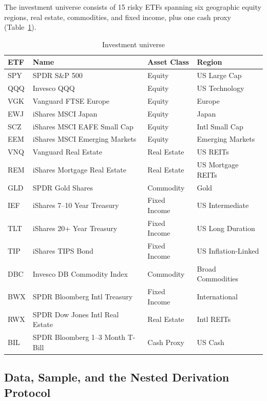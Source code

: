 The investment universe consists of 15 risky ETFs spanning six geographic equity
regions, real estate, commodities, and fixed income, plus one cash proxy
(Table~\ref{tab:universe}).

\begin{table}[H]
\centering
\caption{Investment universe}
\label{tab:universe}
\small
\begin{tabular}{llll}
\toprule
ETF & Name & Asset Class & Region \\
\midrule
SPY & SPDR S\&P 500 & Equity & US Large Cap \\
QQQ & Invesco QQQ & Equity & US Technology \\
VGK & Vanguard FTSE Europe & Equity & Europe \\
EWJ & iShares MSCI Japan & Equity & Japan \\
SCZ & iShares MSCI EAFE Small Cap & Equity & Intl Small Cap \\
EEM & iShares MSCI Emerging Markets & Equity & Emerging Markets \\
VNQ & Vanguard Real Estate & Real Estate & US REITs \\
REM & iShares Mortgage Real Estate & Real Estate & US Mortgage REITs \\
GLD & SPDR Gold Shares & Commodity & Gold \\
IEF & iShares 7--10 Year Treasury & Fixed Income & US Intermediate \\
TLT & iShares 20+ Year Treasury & Fixed Income & US Long Duration \\
TIP & iShares TIPS Bond & Fixed Income & US Inflation-Linked \\
DBC & Invesco DB Commodity Index & Commodity & Broad Commodities \\
BWX & SPDR Bloomberg Intl Treasury & Fixed Income & International \\
RWX & SPDR Dow Jones Intl Real Estate & Real Estate & Intl REITs \\
\midrule
BIL & SPDR Bloomberg 1--3 Month T-Bill & Cash Proxy & US Cash \\
\bottomrule
\end{tabular}
\end{table}

\subsection{Data, Sample, and the Nested Derivation Protocol}
\label{sec:data}

